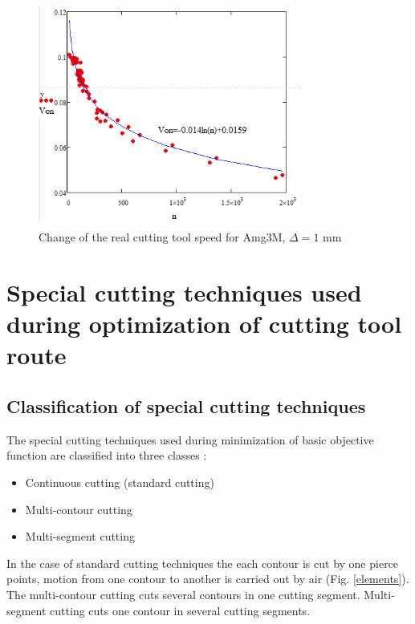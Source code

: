 \documentclass[runningheads]{llncs}
\begin{document}
\begin{figure}
  \begin{center}
  \includegraphics[width=0.77\textwidth]{plot.png}
  \caption{Change of the real cutting tool speed for Amg3M, $\Delta=1$ mm}
  \label{plot}
  \end{center}
\end{figure}


\section{Special cutting techniques used during optimization of cutting tool route}

\subsection{Classification of special cutting techniques}

The special cutting techniques used during minimization of basic objective function
are classified into three classes
\cite{Petunin2015Nov}:

\begin{itemize}
\item Continuous cutting (standard cutting)
\item Multi-contour cutting
\item	Multi-segment cutting
\end{itemize}

In the case of standard cutting techniques
the each contour is cut by one pierce points,
motion from one contour to another is carried out by air (Fig. \ref{elements}).
The multi-contour cutting cuts several contours in one cutting segment.
Multi-segment cutting cuts one contour in several cutting segments.
\end{document}
